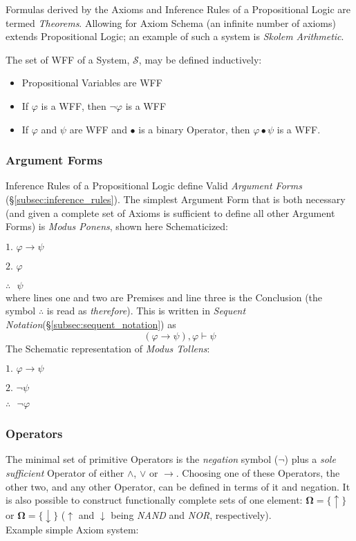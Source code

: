 \documentclass{article}
\begin{document}
Formulas derived by the Axioms and Inference Rules of a Propositional
Logic are termed \emph{Theorems}. Allowing for Axiom Schema (an
infinite number of axioms) extends Propositional Logic; an example of
such a system is \emph{Skolem Arithmetic}\cite{skolem23}.

The set of WFF of a System, $\mathcal{S}$, may be defined inductively:
\begin{itemize}
\item Propositional Variables are WFF
\item If $\varphi$ is a WFF, then $\neg\varphi$ is a WFF
\item If $\varphi$ and $\psi$ are WFF and $\bullet$ is a binary Operator,
  then $\varphi \bullet \psi$ is a WFF.
\end{itemize}

\subsubsection{Argument Forms}

Inference Rules of a Propositional Logic define Valid \emph{Argument
  Forms} (\S\ref{subsec:inference_rules}). The simplest Argument Form
that is both necessary (and given a complete set of Axioms is
sufficient to define all other Argument Forms) is \emph{Modus Ponens},
shown here Schematicized:

$\textrm{1. }\varphi \rightarrow \psi$

$\textrm{2. }\varphi$

$\therefore\textrm{ }\psi$
\\
where lines one and two are Premises and line three is the Conclusion
(the symbol $\therefore$ is read as \emph{therefore}). This is written in
\emph{Sequent Notation}(\S\ref{subsec:sequent_notation}) as
\[(\varphi \rightarrow \psi), \varphi \vdash \psi\]
The Schematic representation of \emph{Modus Tollens}:

$\textrm{1. }\varphi \rightarrow \psi$

$\textrm{2. }\neg\psi$

$\therefore\textrm{ }\neg\varphi$

\subsubsection{Operators}

The minimal set of primitive Operators is the \emph{negation} symbol
($\neg$) plus a \emph{sole sufficient} Operator of either $\land$,
$\lor$ or $\rightarrow$. Choosing one of these Operators, the other
two, and any other Operator, can be defined in terms of it and
negation. It is also possible to construct functionally complete sets
of one element: $\mathbf{\Omega} = \{\uparrow\}$ or $\mathbf{\Omega} =
\{\downarrow\}$ ($\uparrow$ and $\downarrow$ being \emph{NAND} and
\emph{NOR}, respectively).
\\
Example simple Axiom system:
\end{document}
